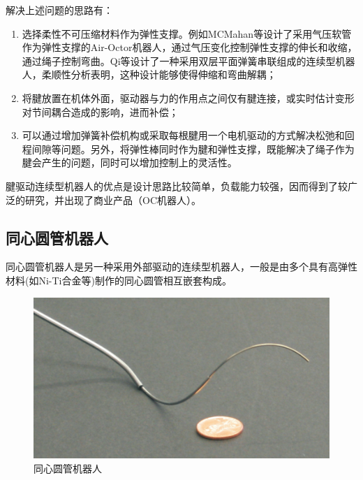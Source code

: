 解决上述问题的思路有：
\begin{enumerate}
	\item 选择柔性不可压缩材料作为弹性支撑\cite{gravagne_large_2003,liu_development_2016,suh_design_2015,gao_workspace_2015}。例如MCMahan等设计了采用气压软管作为弹性支撑的Air-Octor机器人，通过气压变化控制弹性支撑的伸长和收缩，通过绳子控制弯曲\cite{mcmahan_design_2005}。Qi等设计了一种采用双层平面弹簧串联组成的连续型机器人，柔顺性分析表明，这种设计能够使得伸缩和弯曲解耦\cite{qi_novel_2014,qi_novel_2016}；
	\item 
	将腱放置在机体外面，驱动器与力的作用点之间仅有腱连接，或实时估计变形对节间耦合造成的影响，进而补偿\cite{tonapi_novel_2015}；
	\item 
	可以通过增加弹簧补偿机构\cite{hannan_kinematics_2003}或采取每根腱用一个电机驱动\cite{shang_design_2012}的方式解决松弛和回程间隙等问题。另外，将弹性棒同时作为腱和弹性支撑，既能解决了绳子作为腱会产生的问题，同时可以增加控制上的灵活性\cite{rone_mechanics_2014}。
	
\end{enumerate}

腱驱动连续型机器人的优点是设计思路比较简单，负载能力较强，因而得到了较广泛的研究，并出现了商业产品（OC机器人）。


\subsection{同心圆管机器人}
同心圆管机器人是另一种采用外部驱动的连续型机器人，一般是由多个具有高弹性材料(如Ni-Ti合金等)制作的同心圆管相互嵌套构成。
\begin{figure}[!htbp]
	\centering
	\includegraphics[width=.75\textwidth]{figures/ctm.png}
	\caption{同心圆管机器人\cite{webster_toward_2006}}
	\label{fig:ctm}
\end{figure}
 
